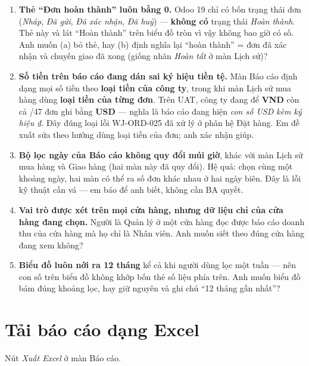 \begin{ask}
\begin{enumerate}[leftmargin=*]
  \item \textbf{Thẻ ``Đơn hoàn thành'' luôn bằng 0.} Odoo 19 chỉ có bốn trạng thái đơn
        (\emph{Nháp}, \emph{Đã gửi}, \emph{Đã xác nhận}, \emph{Đã huỷ}) --- \textbf{không có}
        trạng thái \emph{Hoàn thành}. Thẻ này và lát ``Hoàn thành'' trên biểu đồ tròn vì vậy
        không bao giờ có số. Anh muốn (a) bỏ thẻ, hay (b) định nghĩa lại ``hoàn thành'' = đơn
        đã xác nhận và chuyến giao đã xong (giống nhãn \emph{Hoàn tất} ở màn Lịch sử)?
  \item \textbf{Số tiền trên báo cáo đang dán sai ký hiệu tiền tệ.} Màn Báo cáo định dạng mọi
        số tiền theo \textbf{loại tiền của công ty}, trong khi màn Lịch sử mua hàng dùng
        \textbf{loại tiền của từng đơn}. Trên UAT, công ty đang để \textbf{VND} còn cả
        /47 đơn ghi bằng \textbf{USD} --- nghĩa là báo cáo đang hiện \emph{con số USD
        kèm ký hiệu ₫}. Đây đúng loại lỗi WJ-ORD-025 đã xử lý ở phân hệ Đặt hàng. Em đề xuất
        sửa theo hướng dùng loại tiền của đơn; anh xác nhận giúp.
  \item \textbf{Bộ lọc ngày của Báo cáo không quy đổi múi giờ}, khác với màn Lịch sử mua hàng
        và Giao hàng (hai màn này đã quy đổi). Hệ quả: chọn cùng một khoảng ngày, hai màn có thể
        ra số đơn khác nhau ở hai ngày biên. Đây là lỗi kỹ thuật cần vá --- em báo để anh biết,
        không cần BA quyết.
  \item \textbf{Vai trò được xét trên mọi cửa hàng, nhưng dữ liệu chỉ của cửa hàng đang chọn.}
        Người là Quản lý ở một cửa hàng đọc được báo cáo doanh thu của cửa hàng mà họ chỉ là
        Nhân viên. Anh muốn siết theo đúng cửa hàng đang xem không?
  \item \textbf{Biểu đồ luôn nới ra 12 tháng} kể cả khi người dùng lọc một tuần --- nên con số
        trên biểu đồ không khớp bốn thẻ số liệu phía trên. Anh muốn biểu đồ bám đúng khoảng
        lọc, hay giữ nguyên và ghi chú ``12 tháng gần nhất''?
\end{enumerate}
\end{ask}

\section{Tải báo cáo dạng Excel}
\medskip

\mvao

Nút \emph{Xuất Excel} ở màn Báo cáo.

